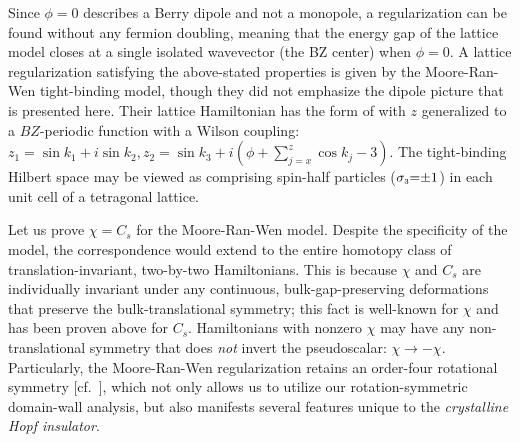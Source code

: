 \documentclass[aps,prl,showpacs,twocolumn,superscriptaddress]{revtex4-1}
\begin{document}
Since $\phi{=}0$ describes a Berry dipole and not a monopole, a regularization can be found without any fermion doubling,\cite{Nielsen_absenceofneutrinos} meaning that the energy gap of the lattice model closes at a single isolated wavevector (the BZ center) when $\phi{=}0$.  
A lattice regularization satisfying the above-stated properties is given by the Moore-Ran-Wen tight-binding model,\cite{Hopfinsulator_Moore} though they did not emphasize the dipole picture that is presented here. Their lattice Hamiltonian has the form of   with $z$ generalized to a $BZ$-periodic function with a Wilson coupling: $ z_1{=}\sin k_1{+}i\sin k_2, z_2{=} \sin k_3 {+}i(\phi+{\sum}_{j=x}^z\cos k_j -3).$ The tight-binding Hilbert space may be viewed as comprising spin-half particles ($\sigma_{\scriptscriptstyle{3}}{=}{\pm}1$) in each unit cell of a tetragonal lattice. 





Let us prove $\chi{=}C_s$ for the Moore-Ran-Wen model. Despite the specificity of the model,  the correspondence would extend to  the entire homotopy class of translation-invariant, two-by-two Hamiltonians. This is because $\chi$ and $C_s$ are individually invariant under any continuous, bulk-gap-preserving deformations that preserve the bulk-translational symmetry; this fact is well-known for $\chi$\cite{pontrjagin_classification,Hopfinsulator_Moore} and has been proven above for $C_s$. 
Hamiltonians with nonzero $\chi$ may have any non-translational symmetry that does \textit{not} invert the pseudoscalar: $\chi {\rightarrow}{-}\chi$. Particularly, the Moore-Ran-Wen regularization retains an order-four rotational symmetry [cf.\ ], which not only allows us to utilize our rotation-symmetric domain-wall analysis, but also manifests several features unique to the \textit{crystalline Hopf insulator}.



\end{document}
